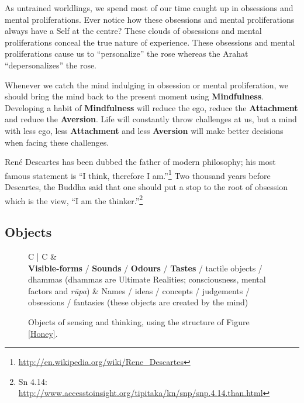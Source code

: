 As untrained worldlings, we spend most of our time caught up in obsessions and mental proliferations. Ever notice how these obsessions and mental proliferations always have a Self at the centre? These clouds of obsessions and mental proliferations conceal the true nature of experience. These obsessions and mental proliferations cause us to “personalize” the rose whereas the Arahat “depersonalizes” the rose.

Whenever we catch the mind indulging in obsession or mental proliferation, we should bring the mind back to the present moment using \textbf{Mindfulness}. Developing a habit of \textbf{Mindfulness} will reduce the ego, reduce the \textbf{Attachment} and reduce the \textbf{Aversion}. Life will constantly throw challenges at us, but a mind with less ego, less \textbf{Attachment} and less \textbf{Aversion} will make better decisions when facing these challenges.

René Descartes has been dubbed the father of modern philosophy; his most famous statement is “I think, therefore I am.”\footnote{\url{http://en.wikipedia.org/wiki/Rene_Descartes}} Two thousand years before Descartes, the Buddha said that one should put a stop to the root of obsession which is the view, “I am the thinker.”\footnote{Sn 4.14: \url{http://www.accesstoinsight.org/tipitaka/kn/snp/snp.4.14.than.html}}

\subsection*{Objects}

\begin{figure}[H]
\begin{tabular*}{\textwidth}{C{\tabcolsep} | C{\tabcolsep}}
\toprule
{} &  \\
\midrule
\textbf{Visible-forms} / \textbf{Sounds} / \textbf{Odours} / \textbf{Tastes} / tactile objects / dhammas\newline
 (dhammas are Ultimate Realities; consciousness, mental factors and \textit{rūpa})
 &
 Names / ideas / concepts / judgements / obsessions / fantasies\newline
 (these objects are created by the mind)
 \\
 
\bottomrule
\end{tabular*}
\caption{Objects of sensing and thinking, using the structure of Figure \ref{Honey}.}
\label{objects}
\end{figure}

